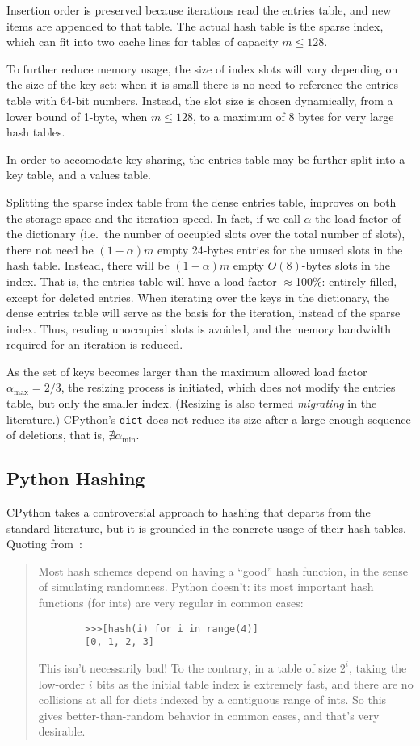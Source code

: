 Insertion order is preserved because iterations read the entries table, and new items are appended to that table.
The actual hash table is the sparse index, which can fit into two cache lines for tables of capacity $m \leq 128$.

To further reduce memory usage, the size of index slots will vary depending on the size of the key set: when it is small there is no need to reference the entries table with 64-bit numbers.
Instead, the slot size is chosen dynamically, from a lower bound of 1-byte, when $m \leq 128$, to a maximum of 8 bytes for very large hash tables.

In order to accomodate key sharing, the entries table may be further split into a key table, and a values table.

Splitting the sparse index table from the dense entries table, improves on both the storage space and the iteration speed.
In fact, if we call $\alpha$ the load factor of the dictionary (i.e.\ the number of occupied slots over the total number of slots), there not need be $(1 - \alpha)m$ empty 24-bytes entries for the unused slots in the hash table.
Instead, there will be $(1 - \alpha)m$ empty $O(8)$-bytes slots in the index.
That is, the entries table will have a load factor $\approx$100\%: entirely filled, except for deleted entries.
When iterating over the keys in the dictionary, the dense entries table will serve as the basis for the iteration, instead of the sparse index.
Thus, reading unoccupied slots is avoided, and the memory bandwidth required for an iteration is reduced.

As the set of keys becomes larger than the maximum allowed load factor $\alpha_{\max} = 2/3$, the resizing process is initiated, which does not modify the entries table, but only the smaller index.
(Resizing is also termed \emph{migrating} in the literature.)
CPython's \texttt{dict} does not reduce its size after a large-enough sequence of deletions, that is, $\nexists\alpha_{\min}$.


\subsection{Python Hashing}\label{subsec:python-generated-hash-values}

CPython takes a controversial approach to hashing that departs from the standard literature, but it is grounded in the concrete usage of their hash tables.
Quoting from~\cite{dict-comment-hash}:
\begin{quote}
	Most hash schemes depend on having a ``good'' hash function, in the sense of simulating randomness.
	Python doesn't:  its most important hash functions (for ints) are very regular in common cases:
	\begin{verbatim}
		>>>[hash(i) for i in range(4)]
	  	[0, 1, 2, 3]
	\end{verbatim}
	This isn't necessarily bad!
	To the contrary, in a table of size $2^i$, taking the low-order $i$ bits as the initial table index is extremely fast, and there are no collisions at all for dicts indexed by a contiguous range of ints.
	So this gives better-than-random behavior in common cases, and that's very desirable.
\end{quote}


